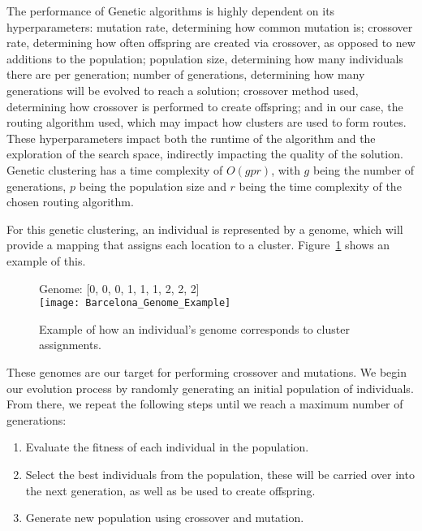 The performance of Genetic algorithms is highly dependent on its hyperparameters: mutation rate, determining how
common mutation is; crossover rate, determining how often offspring are created via crossover, as opposed to new
additions to the population; population size, determining how many individuals there are per generation; number of
generations, determining how many generations will be evolved to reach a solution; crossover method used,
determining how crossover is performed to create offspring; and in our case, the routing algorithm used, which may
impact how clusters are used to form routes.
These hyperparameters impact both the runtime of the algorithm and the exploration of the search space, indirectly
impacting the quality of the solution.
Genetic clustering has a time complexity of $O(g p r)$, with $g$ being the number of generations, $p$ being the
population size and $r$ being the time complexity of the chosen routing algorithm.\\

\noindent
For this genetic clustering, an individual is represented by a genome, which will provide a mapping that assigns each
location to a cluster.
Figure~\ref{fig:barcelona-genome-example} shows an example of this.
\begin{figure}[H]
    \centering
    Genome: [0, 0, 0, 1, 1, 1, 2, 2, 2]\\
    \texttt{[image: Barcelona\_Genome\_Example]}
    \caption{Example of how an individual's genome corresponds to cluster assignments.}
    \label{fig:barcelona-genome-example}
\end{figure}

\noindent
These genomes are our target for performing crossover and mutations.
We begin our evolution process by randomly generating an initial population of individuals.
From there, we repeat the following steps until we reach a maximum number of generations:
\begin{enumerate}
    \item Evaluate the fitness of each individual in the population.
    \item Select the best individuals from the population, these will be carried over into the next generation, as
    well as be used to create offspring.
    \item Generate new population using crossover and mutation.
\end{enumerate}

